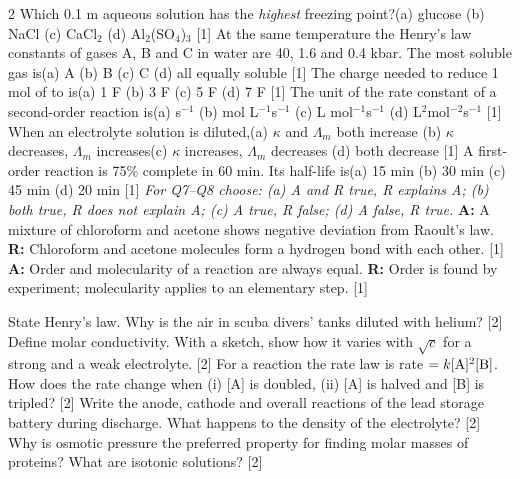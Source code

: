 \documentclass[10pt,a4paper]{extarticle}
\newcommand{\mk}[1]{{\scriptsize\color{black!55}[#1]}}
\begin{document}
\begin{multicols}{2}\raggedcolumns
{}
\Q Which 0.1 m aqueous solution has the \emph{highest} freezing point?\nl (a) glucose \quad (b) NaCl \quad (c) CaCl$_2$ \quad (d) Al$_2$(SO$_4$)$_3$ \mk{1}
\Q At the same temperature the Henry's law constants of gases A, B and C in water are 40, 1.6 and 0.4 kbar. The most soluble gas is\nl (a) A \quad (b) B \quad (c) C \quad (d) all equally soluble \mk{1}
\Q The charge needed to reduce 1 mol of  to  is\nl (a) 1 F \quad (b) 3 F \quad (c) 5 F \quad (d) 7 F \mk{1}
\Q The unit of the rate constant of a second-order reaction is\nl (a) s$^{-1}$ \quad (b) mol L$^{-1}$s$^{-1}$ \quad (c) L mol$^{-1}$s$^{-1}$ \quad (d) L$^2$mol$^{-2}$s$^{-1}$ \mk{1}
\Q When an electrolyte solution is diluted,\nl (a) $\kappa$ and $\Lambda_m$ both increase \quad (b) $\kappa$ decreases, $\Lambda_m$ increases\nl (c) $\kappa$ increases, $\Lambda_m$ decreases \quad (d) both decrease \mk{1}
\Q A first-order reaction is 75\% complete in 60 min. Its half-life is\nl (a) 15 min \quad (b) 30 min \quad (c) 45 min \quad (d) 20 min \mk{1}
\nl\textit{For Q7--Q8 choose: (a) A and R true, R explains A; (b) both true, R does not explain A; (c) A true, R false; (d) A false, R true.}
\Q \textbf{A:} A mixture of chloroform and acetone shows negative deviation from Raoult's law. \textbf{R:} Chloroform and acetone molecules form a hydrogen bond with each other. \mk{1}
\Q \textbf{A:} Order and molecularity of a reaction are always equal. \textbf{R:} Order is found by experiment; molecularity applies to an elementary step. \mk{1}

\Q State Henry's law. Why is the air in scuba divers' tanks diluted with helium? \mk{2}
\Q Define molar conductivity. With a sketch, show how it varies with $\sqrt c$ for a strong and a weak electrolyte. \mk{2}
\Q For a reaction the rate law is rate $=k[\ce A]^2[\ce B]$. How does the rate change when (i) [A] is doubled, (ii) [A] is halved and [B] is tripled? \mk{2}
\Q Write the anode, cathode and overall reactions of the lead storage battery during discharge. What happens to the density of the electrolyte? \mk{2}
\Q Why is osmotic pressure the preferred property for finding molar masses of proteins? What are isotonic solutions? \mk{2}


\end{multicols}
\end{document}
